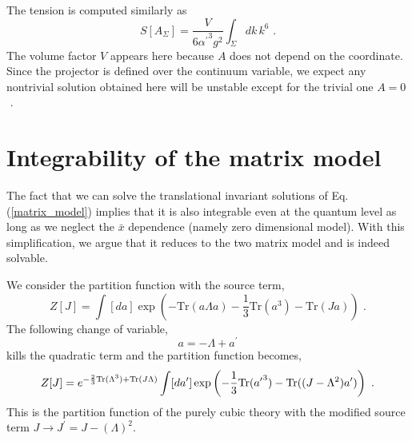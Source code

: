 \documentclass[a4paper,aps,preprint,nofootinbib,eqsecnum]{revtex4}
\begin{document}
The tension is computed similarly as
\begin{equation}
S[A_\Sigma]=\frac{V}{6{\alpha^{\prime}}^3g^2} \int_\Sigma dk \,k^6\,\,.
\end{equation}
The volume factor $V$ appears here because $A$ does not depend on the
coordinate. Since the projector is defined over the continuum variable, we
expect any nontrivial solution obtained here will be unstable except for the
trivial one $A=0$\,\,.


\section{Integrability of the matrix model}

\label{s:integrability} The fact that we can solve the translational
invariant solutions of Eq.(\ref{matrix_model}) implies that it is also
integrable even at the quantum level as long as we neglect the $\bar{x}$
dependence (namely zero dimensional model). With this simplification, we
argue that it reduces to the two matrix model and is indeed solvable.

We consider the partition function with the source term,
\begin{equation}
Z[J]=\int [d{a}] \exp\left( - \mbox{Tr}({a}\Lambda{a}) -\frac{1}{3} \mbox{Tr}%
({a}^3) -\mbox{Tr}(J{a}) \right)\,\,.
\end{equation}
The following change of variable,
\begin{equation}
{a}=-\Lambda+{a}^{\prime}
\end{equation}
kills the quadratic term and the partition function becomes,
\begin{equation}
Z[J]=e^{-\frac{2}{3}\mathrm{Tr}(\Lambda^3) + \mathrm{Tr} (J\Lambda)} \int [d{%
a}^{\prime}] \exp\left( -\frac{1}{3}\mbox{Tr}({{a}^{\prime}}^3) - \mbox{Tr}%
((J-\Lambda^2){a}^{\prime}) \right)\,\,.
\end{equation}
This is the partition function of the purely cubic theory with the modified
source term $J\rightarrow J^{\prime}=J-(\Lambda)^2$.
\end{document}

